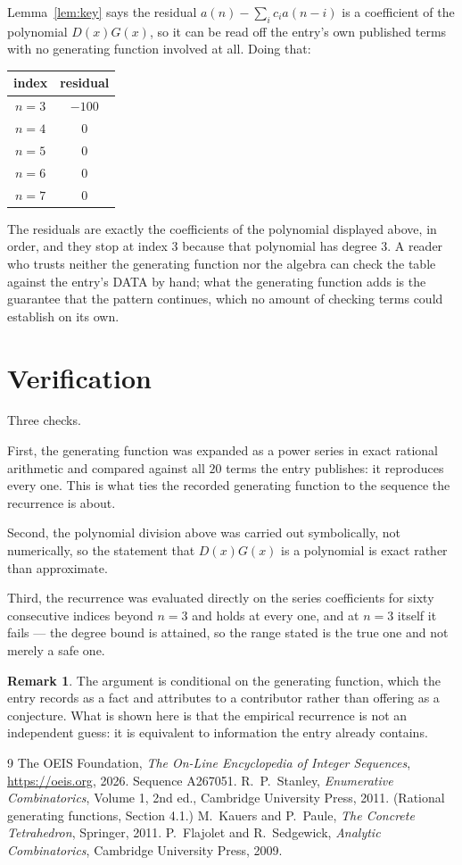 \documentclass[11pt,a4paper]{article}
\theoremstyle{plain}
\theoremstyle{definition}
\newtheorem{remark}[theorem]{Remark}
\begin{document}
Lemma~\ref{lem:key} says the residual $a(n)-\sum_ic_ia(n-i)$ is a coefficient of the
polynomial $D(x)G(x)$, so it can be read off the entry's own published terms with no
generating function involved at all. Doing that:
\begin{center}
\begin{tabular}{cc}
index & residual \\ \hline
$n=3$ & $-100$ \\
$n=4$ & $0$ \\
$n=5$ & $0$ \\
$n=6$ & $0$ \\
$n=7$ & $0$
\end{tabular}
\end{center}
The residuals are exactly the coefficients of the polynomial displayed above, in order, and
they stop at index $3$ because that polynomial has degree $3$. A reader who trusts
neither the generating function nor the algebra can check the table against the entry's DATA
by hand; what the generating function adds is the guarantee that the pattern continues, which
no amount of checking terms could establish on its own.

\section{Verification}

Three checks.

First, the generating function was expanded as a power series in exact rational arithmetic and
compared against all $20$ terms the entry publishes: it reproduces every one. This is
what ties the recorded generating function to the sequence the recurrence is about.

Second, the polynomial division above was carried out symbolically, not numerically, so the
statement that $D(x)G(x)$ is a polynomial is exact rather than approximate.

Third, the recurrence was evaluated directly on the series coefficients for sixty consecutive
indices beyond $n=3$ and holds at every one, and at $n=3$ itself it fails --- the
degree bound is attained, so the range stated is the true one and not merely a safe one.

\begin{remark}
The argument is conditional on the generating function, which the entry records as a fact and
attributes to a contributor rather than offering as a conjecture. What is shown here is that
the empirical recurrence is not an independent guess: it is equivalent to information the
entry already contains.
\end{remark}

\begin{thebibliography}{9}
 The OEIS Foundation, \emph{The On-Line Encyclopedia of Integer
Sequences}, \url{https://oeis.org}, 2026. Sequence A267051.
 R.~P.~Stanley, \emph{Enumerative Combinatorics}, Volume 1, 2nd ed.,
Cambridge University Press, 2011. (Rational generating functions, Section 4.1.)
 M.~Kauers and P.~Paule, \emph{The Concrete Tetrahedron}, Springer, 2011.
 P.~Flajolet and R.~Sedgewick, \emph{Analytic Combinatorics}, Cambridge
University Press, 2009.
\end{thebibliography}
\end{document}
